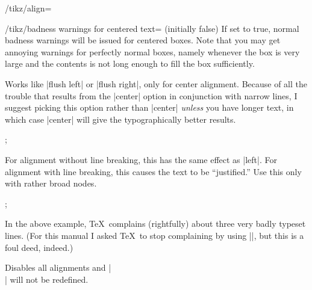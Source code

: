\begin{key}{/tikz/align=}
\begin{description}
    \begin{key}{/tikz/badness warnings for centered text= (initially false)}
      If set to true, normal badness warnings will be issued for
      centered boxes. Note that you may get annoying warnings for
      perfectly normal boxes, namely whenever the box is very large
      and the contents is not long enough to fill the box
      sufficiently. 
    \end{key}

  \item[|align=|\declare{\texttt{flush center}}]
    Works like |flush left| or |flush right|, only for center
    alignment. Because of all the trouble that results from the
    |center| option in conjunction with narrow lines, I suggest picking
    this option rather than  |center| \emph{unless} you have longer
    text, in which case |center| will give the typographically better
    results. 
\begin{codeexample}[]
\tikz {};
\end{codeexample}

  \item[|align=|\declare{|justify|}]
    For alignment without line breaking, this has the same effect as
    |left|. For alignment with line breaking, this causes the text to
    be ``justified.'' Use this only with rather broad nodes.
{%
\begin{codeexample}[]
\tikz {};
\end{codeexample}
}
  In the above example, \TeX\ complains (rightfully) about three very
  badly typeset lines. (For this manual I asked \TeX\ to stop
  complaining by using ||, but this is a foul deed,
  indeed.)

  \item[|align=|\declare{|none|}]
    Disables all alignments and |\\| will not be redefined.
  \end{description}
\end{key}


